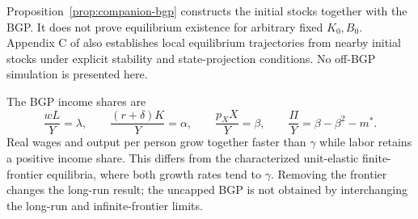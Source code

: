Proposition~\ref{prop:companion-bgp} constructs the initial stocks together
with the BGP. It does not prove equilibrium existence for arbitrary fixed
$K_0,B_0$. Appendix C of \citet{pardo2026future} also establishes local
equilibrium trajectories from nearby initial stocks under explicit stability
and state-projection conditions. No off-BGP simulation is presented here.

The BGP income shares are
\begin{equation}
 \frac{wL}{Y}=\lambda,\qquad
 \frac{(r+\delta)K}{Y}=\alpha,\qquad
 \frac{p_XX}{Y}=\beta,\qquad
 \frac{\Pi}{Y}=\beta-\beta^2-m^*.
 \label{eq:companion-distribution}
\end{equation}
Real wages and output per person grow together faster than $\gamma$ while
labor retains a positive income share. This differs from the characterized
unit-elastic finite-frontier equilibria, where both growth rates tend to
$\gamma$. Removing the frontier changes the long-run result; the uncapped
BGP is not obtained by interchanging the long-run and infinite-frontier limits.
